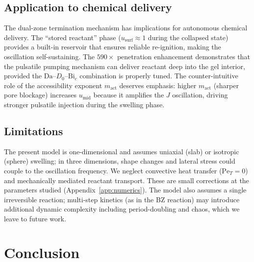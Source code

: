 \documentclass[aps,pre,reprint,superscriptaddress,longbibliography,floatfix]{revtex4-2}
\newcommand{\Da}{\mathrm{Da}}
\newcommand{\Bi}{\mathrm{Bi}}
\newcommand{\Pe}{\mathrm{Pe}}
\begin{document}
\subsection{Application to chemical delivery}

The dual-zone termination mechanism has implications for autonomous
chemical delivery. The ``stored reactant'' phase
($u_\mathrm{surf}\approx 1$ during the collapsed state) provides a
built-in reservoir that ensures reliable re-ignition, making the
oscillation self-sustaining. The $590\times$ penetration enhancement
demonstrates that the pulsatile pumping mechanism can deliver reactant
deep into the gel interior, provided the $\Da$--$D_0$--$\Bi_c$
combination is properly tuned. The counter-intuitive role of the
accessibility exponent $m_\mathrm{act}$ deserves emphasis: higher
$m_\mathrm{act}$ (sharper pore blockage) increases $u_\mathrm{mid}$
because it amplifies the $J$ oscillation, driving stronger pulsatile
injection during the swelling phase.

\subsection{Limitations}

The present model is one-dimensional and assumes uniaxial (slab) or
isotropic (sphere) swelling; in three dimensions, shape changes and
lateral stress could couple to the oscillation frequency. We neglect
convective heat transfer ($\Pe_T=0$) and mechanically mediated reactant
transport. These are small corrections at the parameters studied
(Appendix~\ref{app:numerics}). The model also assumes a single
irreversible reaction; multi-step kinetics (as in the BZ reaction) may
introduce additional dynamic complexity including period-doubling and
chaos, which we leave to future work.


\section{Conclusion}
\label{sec:conclusion}
\end{document}
